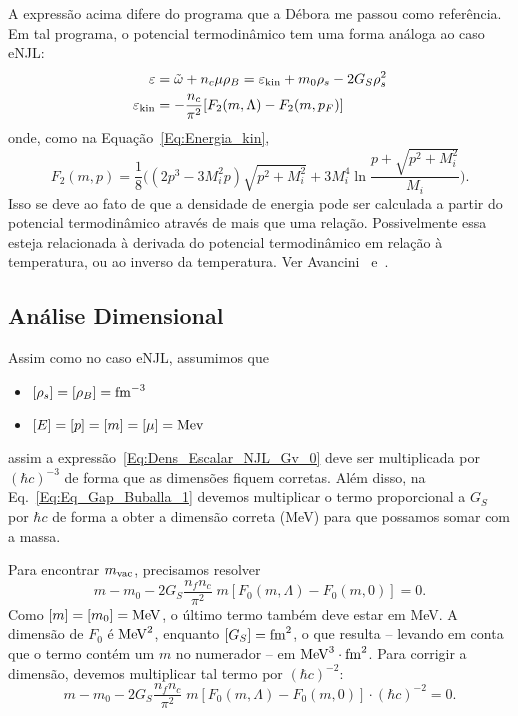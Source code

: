 A expressão acima difere do programa que a Débora me passou como referência. Em tal programa, o potencial termodinâmico tem uma forma análoga ao caso eNJL:
\begin{align}
	\varepsilon &= \tilde{\omega} + n_c\mu\rho_B = \varepsilon_{\rm{kin}} + m_0\rho_s - 2G_S\rho_s^2 \\
	\varepsilon_{\rm{kin}} &= -\frac{n_c}{\pi^2} [F_2(m, \Lambda) - F_2(m, p_F)]
\end{align}
%
onde, como na Equação~\eqref{Eq:Energia_kin},
\begin{equation}
	F_2(m, p) = \frac{1}{8}\Big((2p^3 - 3M_i^2p)\sqrt{p^2 + M_i^2} + 3M_i^4\ln\frac{p + \sqrt{p^2 + M_i^2}}{M_i}\Big).
\end{equation}
%
Isso se deve ao fato de que a densidade de energia pode ser calculada a partir do potencial termodinâmico através de mais que uma relação. Possivelmente essa esteja relacionada à derivada do potencial termodinâmico em relação à temperatura, ou ao inverso da temperatura. Ver Avancini~\cite{Avancini2004} e~\cite{Avancini2006}.

\subsection{Análise Dimensional}

Assim como no caso eNJL, assumimos que
\begin{itemize}
	\item $[\rho_s] = [\rho_B] = \rm{fm}^{-3}$
	\item $[E] = [p] = [m] = [\mu] = \rm{Mev}$
\end{itemize}
%
assim a expressão~\eqref{Eq:Dens_Escalar_NJL_Gv_0} deve ser multiplicada por $(\hbar c)^{-3}$ de forma que as dimensões fiquem corretas. Além disso, na Eq.~\eqref{Eq:Eq_Gap_Buballa_1} devemos multiplicar o termo proporcional a $G_S$ por $\hbar c$ de forma a obter a dimensão correta (MeV) para que possamos somar com a massa.

Para encontrar $m_{\rm{vac}}$, precisamos resolver
\begin{equation}
	m - m_0 - 2G_S\frac{n_f n_c}{\pi^2} \;m [F_0(m, \Lambda) - F_0(m,0)] = 0.
\end{equation}
%
Como $[m] = [m_0] = \rm{MeV}$, o último termo também deve estar em MeV. A dimensão de $F_0$ é $\rm{MeV}^2$, enquanto $[G_S] = \rm{fm}^2$, o que resulta -- levando em conta que o termo contém um $m$ no numerador -- em $\rm{MeV}^3\cdot\rm{fm}^2$. Para corrigir a dimensão, devemos multiplicar tal termo por $(\hbar c)^{-2}$:
\begin{equation}
	m - m_0 - 2G_S\frac{n_f n_c}{\pi^2} \;m [F_0(m, \Lambda) - F_0(m,0)] \cdot (\hbar c)^{-2} = 0.
\end{equation}

